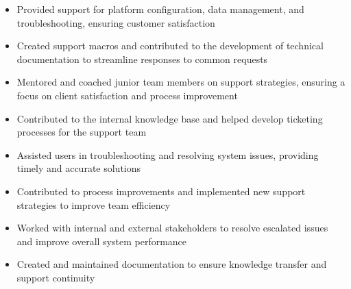 \par\smallskip
\begin{minipage}{13.75cm}
  \begin{minipage}{6.5cm}
    \begin{itemize}
      \item Provided support for platform configuration, data management, and troubleshooting, ensuring customer satisfaction
      \item Created support macros and contributed to the development of technical documentation to streamline responses to common requests
    \end{itemize}
  \end{minipage}
  \hfill
  \begin{minipage}{6.5cm}
    \begin{itemize}
      \item Mentored and coached junior team members on support strategies, ensuring a focus on client satisfaction and process improvement
      \item Contributed to the internal knowledge base and helped develop ticketing processes for the support team
    \end{itemize}
  \end{minipage}
\end{minipage}
\par\smallskip
\divider

\par\smallskip
\begin{minipage}{13.75cm}
  \begin{minipage}{6.5cm}
    \begin{itemize}
      \item Assisted users in troubleshooting and resolving system issues, providing timely and accurate solutions
      \item Contributed to process improvements and implemented new support strategies to improve team efficiency
    \end{itemize}
  \end{minipage}
  \hfill
  \begin{minipage}{6.5cm}
    \begin{itemize}
      \item Worked with internal and external stakeholders to resolve escalated issues and improve overall system performance
      \item Created and maintained documentation to ensure knowledge transfer and support continuity
    \end{itemize}
  \end{minipage}
\end{minipage}

